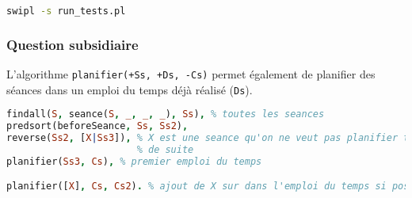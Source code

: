 \begin{lstlisting}[language=bash, caption=Lancer les tests, captionpos=b]
swipl -s run_tests.pl
\end{lstlisting}


\subsubsection{Question subsidiaire}

L'algorithme \texttt{planifier(+Ss, +Ds, -Cs)} permet également de planifier des
séances dans un emploi du temps déjà réalisé (\texttt{Ds}).

\begin{lstlisting}[language=Prolog, caption=Exemple d'ajout dans un EDT, captionpos=b,
label={lst:creneauValideCreneau}]
findall(S, seance(S, _, _, _), Ss), % toutes les seances
predsort(beforeSeance, Ss, Ss2),
reverse(Ss2, [X|Ss3]), % X est une seance qu'on ne veut pas planifier tout
                       % de suite
planifier(Ss3, Cs), % premier emploi du temps

planifier([X], Cs, Cs2). % ajout de X sur dans l'emploi du temps si possible
\end{lstlisting}

